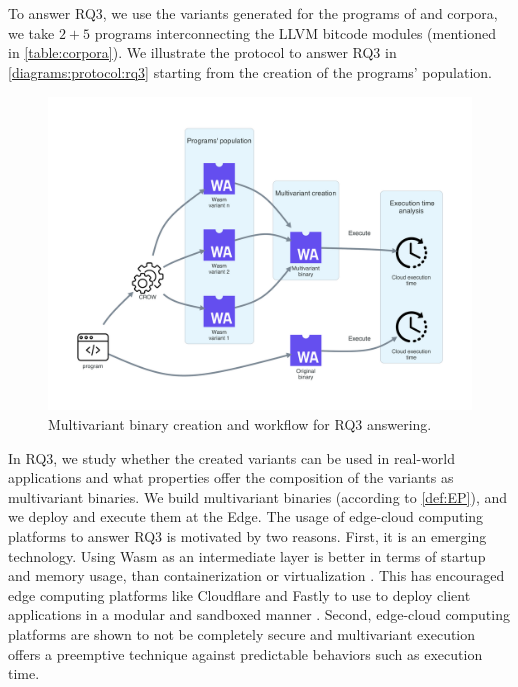 
\section{\rqthree}
\label{rq3:method}




\newcommand{\mewe}{MEWE\xspace}

To answer RQ3, we use the variants generated for the programs of \corpussodium and \corpusqrcode corpora, we take $2 + 5$ programs interconnecting the LLVM bitcode modules (mentioned in \autoref{table:corpora}). We illustrate the protocol to answer RQ3 in \autoref{diagrams:protocol:rq3} starting from the creation of the programs' population.

\begin{figure}[h]
    \centering
    \includegraphics[width=0.8\linewidth]{diagrams/Rq3.pdf}
    \caption{Multivariant binary creation and workflow for RQ3 answering.}
    \label{diagrams:protocol:rq3}
\end{figure}

In RQ3, we study whether the created variants can be used in real-world applications and what properties offer the composition of the variants as multivariant binaries. We build multivariant binaries (according to \autoref{def:EP}), and we deploy and execute them at the Edge. 
The usage of edge-cloud computing platforms to answer RQ3 is motivated by two reasons. First, it is an emerging technology. 
Using Wasm as an intermediate layer is better in terms of startup and memory usage, than containerization or virtualization \cite{pMendkiServerless, 1244493Jacobsson}. 
This has encouraged edge computing platforms like Cloudflare and Fastly to use \wasm to deploy client applications in a modular and sandboxed manner  \cite{CloudflareWasm, FastlyWasm}.
Second, edge-cloud computing platforms are shown to not be completely secure \cite{Narayan2021Swivel} and multivariant execution offers a preemptive technique against predictable behaviors such as execution time.




